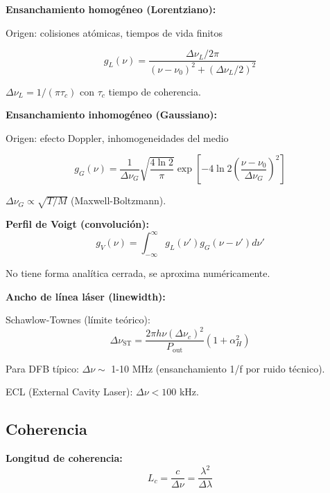 \documentclass[11pt,a4paper]{article}
\begin{document}
\textbf{Ensanchamiento homogéneo (Lorentziano):}

Origen: colisiones atómicas, tiempos de vida finitos

\begin{equation}
    g_L(\nu) = \frac{\Delta\nu_L/2\pi}{(\nu - \nu_0)^2 + (\Delta\nu_L/2)^2}
\end{equation}

$\Delta\nu_L = 1/(\pi\tau_c)$ con $\tau_c$ tiempo de coherencia.

\textbf{Ensanchamiento inhomogéneo (Gaussiano):}

Origen: efecto Doppler, inhomogeneidades del medio

\begin{equation}
    g_G(\nu) = \frac{1}{\Delta\nu_G}\sqrt{\frac{4\ln 2}{\pi}}\exp\left[-4\ln 2\left(\frac{\nu - \nu_0}{\Delta\nu_G}\right)^2\right]
\end{equation}

$\Delta\nu_G \propto \sqrt{T/M}$ (Maxwell-Boltzmann).

\textbf{Perfil de Voigt (convolución):}
\begin{equation}
    g_V(\nu) = \int_{-\infty}^{\infty} g_L(\nu')g_G(\nu - \nu')d\nu'
\end{equation}

No tiene forma analítica cerrada, se aproxima numéricamente.

\begin{importante}
\textbf{Ancho de línea láser (linewidth):}

Schawlow-Townes (límite teórico):
\begin{equation}
    \Delta\nu_{\text{ST}} = \frac{2\pi h\nu(\Delta\nu_c)^2}{P_{\text{out}}} (1 + \alpha_H^2)
\end{equation}

Para DFB típico: $\Delta\nu \sim$ 1-10 MHz (ensanchamiento 1/f por ruido técnico).

ECL (External Cavity Laser): $\Delta\nu < 100$ kHz.
\end{importante}

\subsection{Coherencia}

\textbf{Longitud de coherencia:}
\begin{equation}
    L_c = \frac{c}{\Delta\nu} = \frac{\lambda^2}{\Delta\lambda}
\end{equation}
\end{document}
